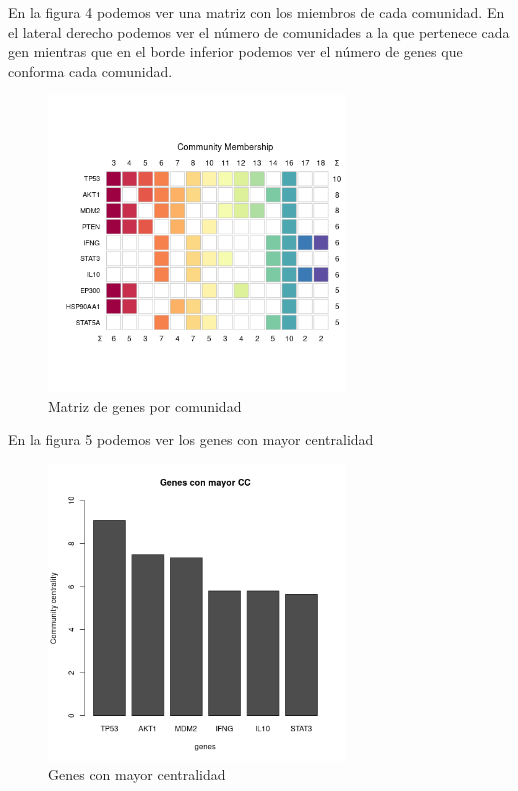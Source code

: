 En la figura 4 podemos ver una matriz con los miembros de cada comunidad. En el lateral derecho podemos ver el número de comunidades a la que pertenece cada gen mientras que en el borde inferior podemos ver el número de genes que conforma cada comunidad. 

\begin{figure}[h]
	\centering
	\includegraphics[width=0.70\textwidth]{figures/03_GenesMasCOnectadosOtrasComunidades.png}
	\caption{Matriz de genes por comunidad}
	\label{fig: Figura 4}
\end{figure}

En la figura 5 podemos ver los genes con mayor centralidad

\begin{figure}[h]
	\centering
	\includegraphics[width=0.70\textwidth]{figures/04_GenesMayorCentralidad.png}
	\caption{Genes con mayor centralidad}
	\label{fig: Figura 5}
\end{figure}

